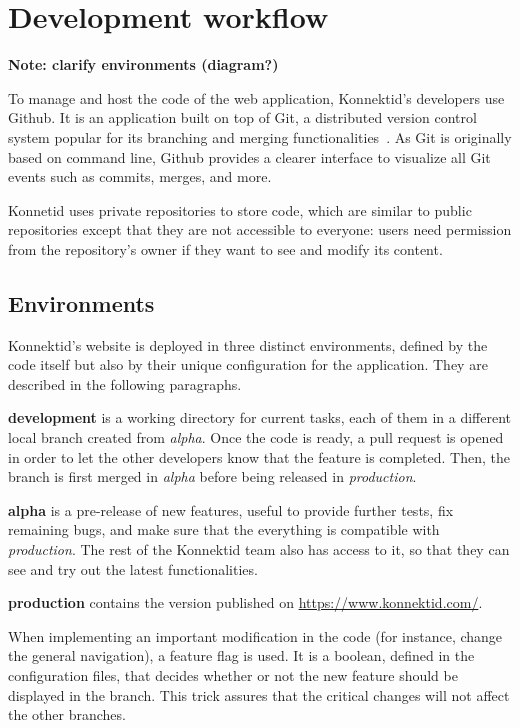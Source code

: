 \section{Development workflow}
\label{sec:github}

\textbf{Note: clarify environments (diagram?)}

To manage and host the code of the web application, Konnektid's developers use Github. It is an application built on top of Git, a distributed version control system popular for its branching and merging functionalities~\cite{git}. As Git is originally based on command line, Github provides a clearer interface to visualize all Git events such as commits, merges, and more. 

Konnetid uses private repositories to store code, which are similar to public repositories except that they are not accessible to everyone: users need permission from the repository's owner if they want to see and modify its content.

\subsection{Environments}
\label{ssec:env}

Konnektid's website is deployed in three distinct environments, defined by the code itself but also by their unique configuration for the application. They are described in the following paragraphs.

\textbf{development} is a working directory for current tasks, each of them in a different local branch created from \textit{alpha}. Once the code is ready, a pull request is opened in order to let the other developers know that the feature is completed. Then, the branch is first merged in \textit{alpha} before being released in \textit{production}. 

\textbf{alpha} is a pre-release of new features, useful to provide further tests, fix remaining bugs, and make sure that the everything is compatible with \textit{production}. The rest of the Konnektid team also has access to it, so that they can see and try out the latest functionalities.

\textbf{production} contains the version published on \url{https://www.konnektid.com/}.

When implementing an important modification in the code (for instance, change the general navigation), a \guillemotleft{} feature flag \guillemotright{} is used. It is a boolean, defined in the configuration files, that decides whether or not the new feature should be displayed in the branch. This trick assures that the critical changes will not affect the other branches.

